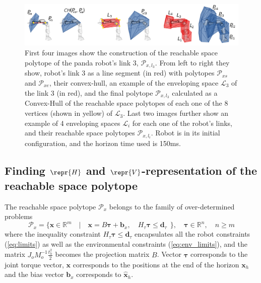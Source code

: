 \begin{figure}[!t]
    \centering
    \includegraphics[width=\linewidth]{Papers/images/minkowski3.png}
    \caption{ First four images show the construction of the reachable space polytope of the panda robot's link 3, $\mathcal{P}_{x,l_3}$. From left to right they show, robot's link 3 as a line segment (in red) with polytopes $\mathcal{P}_{xs}$ and $\mathcal{P}_{xe}$, their convex-hull, an example of the enveloping space $\mathcal{L}_3$ of the link 3 (in red), and the final polytope $\mathcal{P}_{x,l_3}$ calculated as a Convex-Hull of the reachable space polytopes of each one of the 8 vertices (shown in yellow) of $\mathcal{L}_3$.
    Last two images further show an example of 4 enveloping spaces $\mathcal{L}_i$ for each one of the robot's links, and their reachable space polytopes $\mathcal{P}_{x,l_i}$. Robot is in its initial configuration, and the horizon time used is 150ms.}
    \label{fig:minkowski}

\end{figure}


\subsection{Finding $\repr{H}$ and $\repr{V}$-representation of the reachable space polytope}
\label{ch:enumerating}

The reachable space polytope $\mathcal{P}_x$ belongs to the family of over-determined problems
\begin{equation}
    \mathcal{P}_x = \{ \bm{x} \in \mathbb{R}^m \quad| \quad \bm{x}=B\bm{\tau} + \bm{b}_x,\quad  H_\tau\bm{\tau}\leq \bm{d}_\tau ~~\}, \quad \bm{\tau}\in \mathbb{R}^n, \quad n\geq m
\label{eq:polytope_family}
\end{equation}
where the inequality constraint $H_\tau\bm{\tau}\leq \bm{d}_\tau$ encapsulates all the robot constraints (\ref{eq:limits}) as well as the environmental constraints (\ref{eq:env_limits}), and the matrix $J_o M_o^{-1}\frac{t_h^2}{2}$ becomes the projection matrix $B$. Vector $\bm{\tau}$ corresponds to the joint torque vector, $\bm{x}$ corresponds to the positions at the end of the horizon $\bm{x}_{h}$ and the bias vector $\bm{b}_x$ corresponds to $\hat{\bm{x}}_{h}$. 

